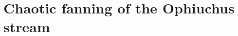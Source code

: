 \chapter[Chaotic fanning of the Ophiuchus stream]{Chaotic fanning of the Ophiuchus stream}
\label{ch:chaos-ophiuchus}



\newcommand{\lyapexp}{\lambda_{\rm max}}
\newcommand{\lyapt}{t_\lambda}

%
%
%
